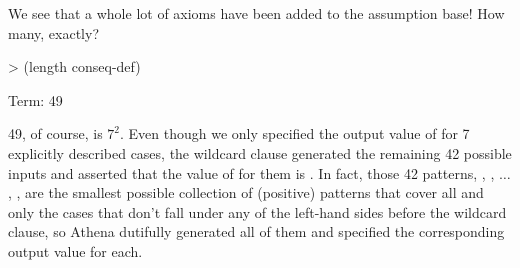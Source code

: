 We see that a whole lot of axioms have been added to the assumption base!
How many, exactly?
\begin{tcAthena}
> (length conseq-def)

Term: 49
\end{tcAthena}
49, of course, is $7^2$. Even though we only specified 
the output value of  for 7 explicitly described
cases, the wildcard clause generated the remaining 42 possible
inputs and asserted that the value of  for them 
is . In fact, those 42 patterns, ,
, $\ldots$, , 
are the smallest possible collection of (positive) patterns 
that cover all and only the cases that don't fall under any
of the left-hand sides before the wildcard clause, so
Athena dutifully generated all of them and specified the
corresponding output value for each. 

